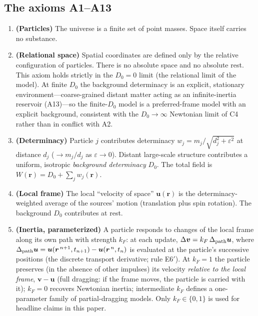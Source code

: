 \documentclass[aps,reprint,amsmath,amssymb,nofootinbib,superscriptaddress,floatfix]{revtex4-2}
\newcommand{\vect}[1]{\bm{#1}}
\newcommand{\Dz}{D_0}
\begin{document}
\subsection{The axioms A1--A13}

\begin{enumerate}
\item[A1.]{\bf (Particles)} The universe is a finite set of point
masses. Space itself carries no substance.

\item[A2.]{\bf (Relational space)} Spatial coordinates are defined only
by the relative configuration of particles. There is no absolute space
and no absolute rest.
This axiom holds strictly in the $\Dz = 0$ limit (the relational
limit of the model).
At finite $\Dz$ the background determinacy is an explicit, stationary
environment---coarse-grained distant matter acting as an
infinite-inertia reservoir (A13)---so the finite-$\Dz$ model is a
preferred-frame model with an explicit background, consistent with the
$\Dz \to \infty$ Newtonian limit of C4 rather than in conflict with
A2.

\item[A3.]{\bf (Determinacy)} Particle $j$ contributes determinacy
$w_j = m_j/\sqrt{d_j^2+\varepsilon^2}$ at distance $d_j$
($\to m_j/d_j$ as $\varepsilon\to 0$).
Distant large-scale structure contributes a uniform, isotropic
\emph{background determinacy} $\Dz$.
The total field is $W(\vect{r}) = \Dz + \sum_j w_j(\vect{r})$.

\item[A4.]{\bf (Local frame)} The local ``velocity of space''
$\vect{u}(\vect{r})$ is the determinacy-weighted average of the
sources' motion (translation plus spin rotation).
The background $\Dz$ contributes at rest.

\item[A5.]{\bf (Inertia, parameterized)} A particle responds to changes
of the local frame along its own path with strength $k_F$:
at each update,
$\Delta\vect{v} = k_F\,\Delta_{\rm path}\vect{u}$, where
$\Delta_{\rm path}\vect{u}
 = \vect{u}(\vect{r}^{\,n+1},t_{n+1}) - \vect{u}(\vect{r}^{\,n},t_n)$
is evaluated at the particle's successive positions (the discrete
transport derivative; rule E6$'$).
At $k_F = 1$ the particle preserves (in the absence of other
impulses) its velocity \emph{relative to the
local frame}, $\vect{v}-\vect{u}$ (full dragging: if the frame moves,
the particle is carried with it); $k_F = 0$ recovers Newtonian inertia;
intermediate $k_F$ defines a one-parameter family of partial-dragging
models.
Only $k_F \in \{0,1\}$ is used for headline claims in this paper.


\end{enumerate}
\end{document}

